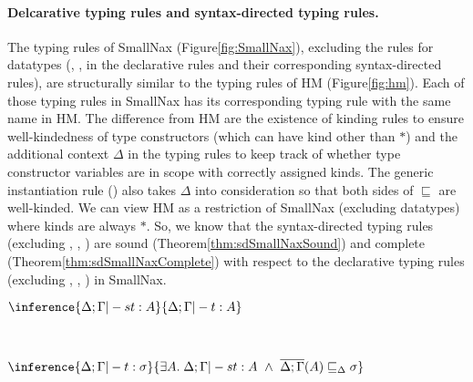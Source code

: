 \paragraph{Delcarative typing rules and syntax-directed typing rules.}
The typing rules of SmallNax (Figure\;\ref{fig:SmallNax}),
excluding the rules for datatypes (, ,
 in the declarative rules and their corresponding
syntax-directed rules), are structurally similar to the typing rules of HM
(Figure\;\ref{fig:hm}). Each of those typing rules in SmallNax has
its corresponding typing rule with the same name in HM.
The difference from HM are the existence of kinding rules to ensure
well-kindedness of type constructors (which can have kind other than $*$)
and the additional context $\Delta$ in the typing rules to keep track of
whether type constructor variables are in scope with correctly assigned kinds.
The generic instantiation rule () also takes $\Delta$ into
consideration so that both sides of $\sqsubseteq$ are well-kinded.
We can view HM as a restriction of SmallNax (excluding datatypes)
where kinds are always $*$. So, we know that the syntax-directed typing rules
(excluding , , )
are sound (Theorem\;\ref{thm:sdSmallNaxSound}) and
complete (Theorem\;\ref{thm:sdSmallNaxComplete})
with respect to the declarative typing rules
(excluding , , ) in SmallNax.
\begin{theorem}
$ \inference{\Delta;\Gamma |-s t : A}{\Delta;\Gamma |- t : A} $
\label{thm:sdSmallNaxSound}
\end{theorem}
\begin{theorem} ~
\begin{center}
$ \inference{\Delta;\Gamma |- t : \sigma}{
	\exists A.\;\Delta;\Gamma |-s t : A ~\land~
	\overline{\Delta;\Gamma}(A) \sqsubseteq_\Delta \sigma} $
\end{center}
\label{thm:sdSmallNaxComplete}
\end{theorem}

